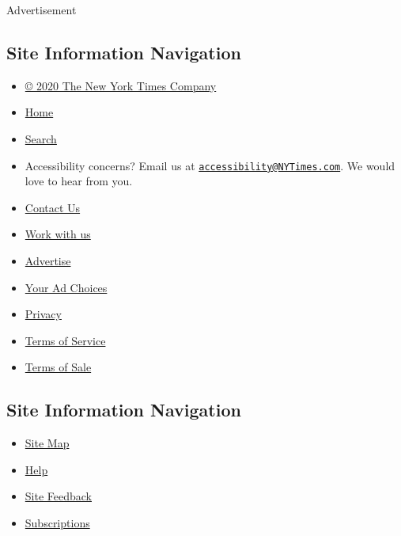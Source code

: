 Advertisement

\hypertarget{site-information-navigation}{%
\subsection{Site Information
Navigation}\label{site-information-navigation}}

\begin{itemize}
\tightlist
\item
  \href{https://help.nytimes3xbfgragh.onion/hc/en-us/articles/115014792127-Copyright-notice}{©
  2020 The New York Times Company}
\item
  \href{https://www.nytimes3xbfgragh.onion}{Home}
\item
  \href{https://www.nytimes3xbfgragh.onion/search/}{Search}
\item
  Accessibility concerns? Email us at
  \href{mailto:accessibility@NYTimes.com}{\nolinkurl{accessibility@NYTimes.com}}.
  We would love to hear from you.
\item
  \href{https://help.nytimes3xbfgragh.onion/hc/en-us/articles/115015385887-Contact-Us}{Contact
  Us}
\item
  \href{https://www.nytco.com/careers/}{Work with us}
\item
  \href{https://nytmediakit.com/}{Advertise}
\item
  \href{https://help.nytimes3xbfgragh.onion/hc/en-us/articles/115014892108-Privacy-policy\#pp}{Your
  Ad Choices}
\item
  \href{https://help.nytimes3xbfgragh.onion/hc/en-us/articles/115014892108-Privacy-policy}{Privacy}
\item
  \href{https://help.nytimes3xbfgragh.onion/hc/en-us/articles/115014893428-Terms-of-service}{Terms
  of Service}
\item
  \href{https://help.nytimes3xbfgragh.onion/hc/en-us/articles/115014893968-Terms-of-sale}{Terms
  of Sale}
\end{itemize}

\hypertarget{site-information-navigation-1}{%
\subsection{Site Information
Navigation}\label{site-information-navigation-1}}

\begin{itemize}
\tightlist
\item
  \href{https://spiderbites.nytimes3xbfgragh.onion}{Site Map}
\item
  \href{https://help.nytimes3xbfgragh.onion/hc/en-us}{Help}
\item
  \href{https://help.nytimes3xbfgragh.onion/hc/en-us/articles/115015385887-Contact-Us?redir=myacc}{Site
  Feedback}
\item
  \href{https://www.nytimes3xbfgragh.onion/subscription?campaignId=37WXW}{Subscriptions}
\end{itemize}
